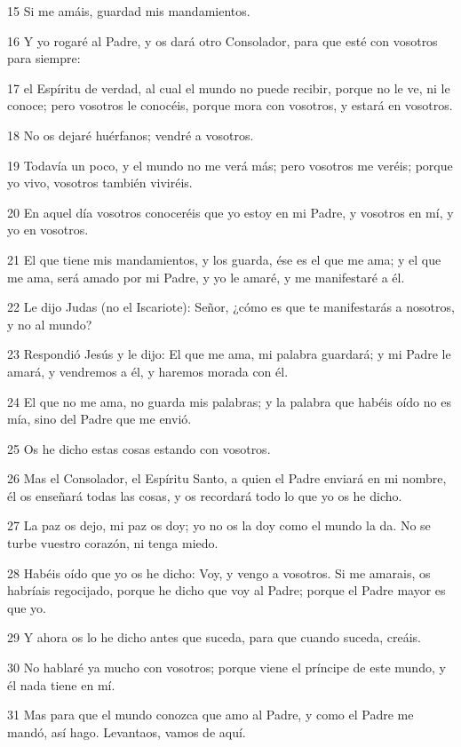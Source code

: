 \par 15 Si me amáis, guardad mis mandamientos.
\par 16 Y yo rogaré al Padre, y os dará otro Consolador, para que esté con vosotros para siempre:
\par 17 el Espíritu de verdad, al cual el mundo no puede recibir, porque no le ve, ni le conoce; pero vosotros le conocéis, porque mora con vosotros, y estará en vosotros.
\par 18 No os dejaré huérfanos; vendré a vosotros.
\par 19 Todavía un poco, y el mundo no me verá más; pero vosotros me veréis; porque yo vivo, vosotros también viviréis.
\par 20 En aquel día vosotros conoceréis que yo estoy en mi Padre, y vosotros en mí, y yo en vosotros.
\par 21 El que tiene mis mandamientos, y los guarda, ése es el que me ama; y el que me ama, será amado por mi Padre, y yo le amaré, y me manifestaré a él.
\par 22 Le dijo Judas (no el Iscariote): Señor, ¿cómo es que te manifestarás a nosotros, y no al mundo?
\par 23 Respondió Jesús y le dijo: El que me ama, mi palabra guardará; y mi Padre le amará, y vendremos a él, y haremos morada con él.
\par 24 El que no me ama, no guarda mis palabras; y la palabra que habéis oído no es mía, sino del Padre que me envió.
\par 25 Os he dicho estas cosas estando con vosotros.
\par 26 Mas el Consolador, el Espíritu Santo, a quien el Padre enviará en mi nombre, él os enseñará todas las cosas, y os recordará todo lo que yo os he dicho.
\par 27 La paz os dejo, mi paz os doy; yo no os la doy como el mundo la da. No se turbe vuestro corazón, ni tenga miedo.
\par 28 Habéis oído que yo os he dicho: Voy, y vengo a vosotros. Si me amarais, os habríais regocijado, porque he dicho que voy al Padre; porque el Padre mayor es que yo.
\par 29 Y ahora os lo he dicho antes que suceda, para que cuando suceda, creáis.
\par 30 No hablaré ya mucho con vosotros; porque viene el príncipe de este mundo, y él nada tiene en mí.
\par 31 Mas para que el mundo conozca que amo al Padre, y como el Padre me mandó, así hago. Levantaos, vamos de aquí.

